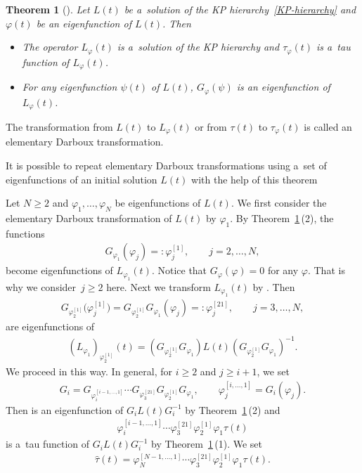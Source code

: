 \documentclass[pdftex]{sigma}
\numberwithin{equation}{section}
\newtheorem{Theorem}{Theorem}[section]
\theoremstyle{definition}
\begin{document}
\begin{Theorem}[\cite{H-van-de-Leur2001,
Kac-van-de-Leur2018,Kakei,Ovel1993}]\label{Darboux-property}
Let $L(t)$ be a~solution of the KP hierarchy~\eqref{KP-hierarchy} and $\varphi(t)$ be an eigenfunction of $L(t)$.
Then
\begin{itemize}\itemsep=0pt
\item[$(1)$] The operator $L_\varphi(t)$ is a~solution of the KP hierarchy and $\tau_\varphi(t)$ is a~tau function of $L_\varphi(t)$.

\item[$(2)$] For any eigenfunction $\psi(t)$ of $L(t)$, $G_\varphi(\psi)$ is an eigenfunction of $L_\varphi(t)$.
\end{itemize}
\end{Theorem}

The transformation from $L(t)$ to $L_\varphi(t)$ or from $\tau(t)$ to $\tau_\varphi(t)$ is called an elementary Darboux transformation.

It is possible to repeat elementary Darboux transformations
using a~set of eigenfunctions of an initial solution $L(t)$ with the help of
this theorem

Let $N\geq 2$ and $\varphi_1,\dots , \varphi_N$ be eigenfunctions of $L(t)$.
We first consider the elementary Darboux transformation of $L(t)$ by
$\varphi_1$. By Theorem~\ref{Darboux-property}\,(2),
the functions
\begin{gather*}
G_{\varphi_1}(\varphi_j)=:\varphi^{[1]}_j,
\qquad
j=2,\dots ,N,
\end{gather*}
become eigenfunctions of $L_{\varphi_1}(t)$.
Notice that $G_\varphi(\varphi)=0$ for any $\varphi$. That is why
we consider~${j\geq 2}$ here.
Next we transform $L_{\varphi_1}(t)$ by . Then
\begin{gather*}
G_{\varphi^{[1]}_2}\bigl(\varphi^{[1]}_j\bigr)=G_{\varphi^{[1]}_2}G_{\varphi_1}(\varphi_j)=:
\varphi^{[21]}_j,
\qquad
j=3,\dots ,N,
\end{gather*}
are eigenfunctions of
\begin{gather*}
(L_{\varphi_1})_{\varphi^{[1]}_2}(t)
=(G_{\varphi^{[1]}_2}G_{\varphi_1})L(t)(G_{\varphi^{[1]}_2}G_{\varphi_1})^{-1}.
\end{gather*}
We proceed in this way.
In general, for $i\geq 2$ and $j\geq i+1$, we set
\begin{gather*}
G_{i}=G_{\varphi_i^{[i-1,\dots ,1]}}\cdots G_{\varphi_3^{[21]}}
G_{\varphi_2^{[1]}}G_{\varphi_1},
\qquad
\varphi_j^{[i,\dots ,1]}= G_i(\varphi_j).
\end{gather*}
Then  is an eigenfunction of $G_{i}L(t)G_{i}^{-1}$ by
 Theorem~\ref{Darboux-property}\,(2) and
\begin{gather*}
\varphi_i^{[i-1,\dots ,1]}\cdots \varphi_3^{[21]}\varphi_2^{[1]}\varphi_1\tau(t)
\end{gather*}
is a~tau function of $G_{i}L(t)G_{i}^{-1}$ by Theorem~\ref{Darboux-property}\,(1).
We set
\begin{gather}
\widehat{\tau}(t)=
\varphi_N^{[N-1,\dots ,1]}\cdots \varphi_3^{[21]}\varphi_2^{[1]}\varphi_1\tau(t).
\label{tau-hat}
\end{gather}
\end{document}
